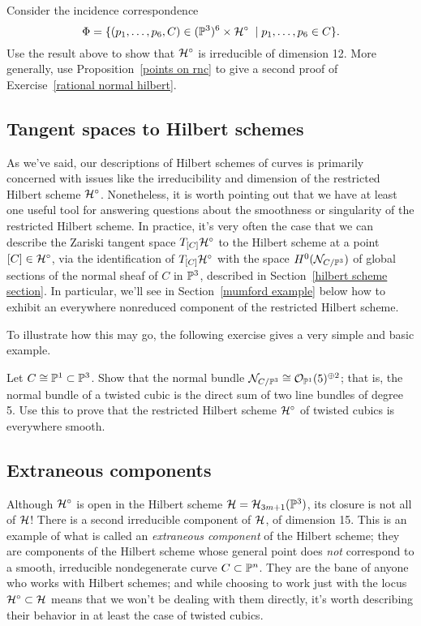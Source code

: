\begin{exercise}
Consider the incidence correspondence
$$
\Phi = \{ (p_1,\dots,p_6, C) \in (\PP^3)^6 \times \cH^\circ \; \mid p_1,\dots,p_6 \in C  \}.
$$
Use the result above to show that $\cH^\circ$ is irreducible of dimension 12. More generally, use Proposition~\ref{points on rnc} to give a second proof of Exercise~\ref{rational normal hilbert}.
\end{exercise}

\subsection{Tangent spaces to Hilbert schemes}

As we've said, our descriptions of Hilbert schemes of curves is primarily concerned with issues like the irreducibility and dimension of the restricted Hilbert scheme $\cH^\circ$. Nonetheless, it is worth pointing out that we have at least one useful tool for answering questions about the smoothness or singularity of the restricted Hilbert scheme. In practice, it's very often the case that we can describe the Zariski tangent space $T_{[C]}\cH^\circ$ to the Hilbert scheme at a point $[C] \in \cH^\circ$, via the identification of $T_{[C]}\cH^\circ$ with the space $H^0(\cN_{C/\PP^3})$ of global sections of the normal sheaf of $C$ in $\PP^3$, described in Section~\ref{hilbert scheme section}. In particular, we'll see in Section~\ref{mumford example} below how to exhibit an everywhere nonreduced component of the restricted Hilbert scheme.

To illustrate how this may go, the following exercise gives a very simple and basic example.

\begin{exercise}\label{twisted cubic normal bundle}
Let $C \cong \PP^1 \subset \PP^3$. Show that the normal bundle $\cN_{C/\PP^3} \cong \cO_{\PP^1}(5)^{\oplus 2}$; that is, the normal bundle of a twisted cubic is the direct sum of two line bundles of degree 5. Use this to prove that the restricted Hilbert scheme $\cH^\circ$ of twisted cubics is everywhere smooth.
\end{exercise}

\subsection{Extraneous components}


Although $\cH^\circ$ is open in the Hilbert scheme $\cH = \cH_{3m+1}(\PP^3)$, its closure is not all of $\cH$! There is a second irreducible component of $\cH$, of dimension 15. This is an example of what is called an \emph{extraneous component} of the Hilbert scheme; they are components of the Hilbert scheme whose general point does \emph{not} correspond to a smooth, irreducible nondegenerate curve $C \subset \PP^n$. They are the bane of anyone who works with Hilbert schemes; and while choosing to work just with the locus $\cH^\circ \subset \cH$ means that we won't be dealing with them directly, it's worth describing their behavior in at least the case of twisted cubics.


